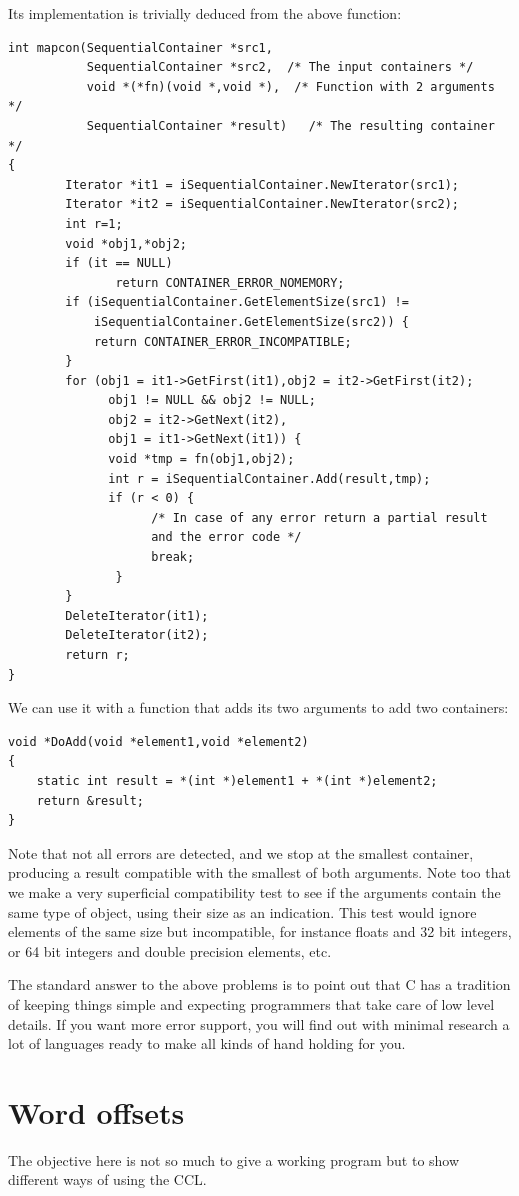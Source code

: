 \documentclass[12pt,a4paper,openany]{memoir} %
\begin{document}
{{Its implementation is trivially deduced from the above function:
\begin{verbatim}
int mapcon(SequentialContainer *src1,
           SequentialContainer *src2,  /* The input containers */
           void *(*fn)(void *,void *),  /* Function with 2 arguments */
           SequentialContainer *result)   /* The resulting container */
{
        Iterator *it1 = iSequentialContainer.NewIterator(src1);
        Iterator *it2 = iSequentialContainer.NewIterator(src2);
        int r=1;
        void *obj1,*obj2;
        if (it == NULL)
               return CONTAINER_ERROR_NOMEMORY;
        if (iSequentialContainer.GetElementSize(src1) != 
            iSequentialContainer.GetElementSize(src2)) {
            return CONTAINER_ERROR_INCOMPATIBLE;
        }
        for (obj1 = it1->GetFirst(it1),obj2 = it2->GetFirst(it2);
              obj1 != NULL && obj2 != NULL;
              obj2 = it2->GetNext(it2),
              obj1 = it1->GetNext(it1)) {
              void *tmp = fn(obj1,obj2);
              int r = iSequentialContainer.Add(result,tmp);
              if (r < 0) {
                    /* In case of any error return a partial result 
                    and the error code */
                    break;
               }
        }
        DeleteIterator(it1);
        DeleteIterator(it2);
        return r;
}
\end{verbatim}
We can use it with a function  that adds its two arguments to add two containers:
\begin{verbatim}
void *DoAdd(void *element1,void *element2)
{
    static int result = *(int *)element1 + *(int *)element2;
    return &result;
}
\end{verbatim}
Note that not all errors are detected, and we stop at the smallest container, producing a result compatible with the smallest of both arguments.
Note too that we make a very superficial compatibility test to see if the arguments contain the same type of object, using their size as an indication. This test would ignore elements of the same size but incompatible, for instance floats and 32 bit integers, or 64 bit integers and double precision elements, etc.

The standard answer to the above problems is to point out that C has a tradition of keeping things simple and expecting programmers that take care of low level details. If you want more error support, you will find out with minimal research a lot of languages ready to make all kinds of hand holding for you.

\section{Word offsets}
The objective here is not so much to give a working program but to show different ways of using the CCL.
}}
\end{document}

